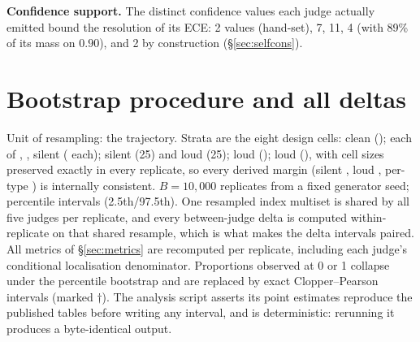 \textbf{Confidence support.} The distinct confidence values each judge actually emitted bound
the resolution of its ECE:  2 values (hand-set),  7,
 11,  4 (with 89\% of its mass on $0.90$), and
 2 by construction (\S\ref{sec:selfcons}).

\section{Bootstrap procedure and all deltas}
\label{app:bootstrap}

Unit of resampling: the trajectory. Strata are the eight design cells: clean (\tjNClean); each
of , ,  silent
(\tjNPerType{} each);  silent (25) and loud (25);
 loud (\tjNPerType);  loud
(\tjNPerType), with cell sizes preserved exactly in every replicate, so every derived
margin (silent \tjNSilent, loud \tjNLoud, per-type \tjNPerType) is internally consistent.
$B = 10{,}000$ replicates from a fixed generator seed; percentile intervals (2.5th/97.5th).
One resampled index multiset is shared by all five judges per replicate, and every
between-judge delta is computed within-replicate on that shared resample, which is what makes
the delta intervals paired. All metrics of \S\ref{sec:metrics} are recomputed per replicate,
including each judge's conditional localisation denominator. Proportions observed at 0 or 1
collapse under the percentile bootstrap and are replaced by exact Clopper--Pearson intervals
(marked $\dagger$). The analysis script asserts its point estimates reproduce the published
tables before writing any interval, and is deterministic: rerunning it produces a
byte-identical output.

